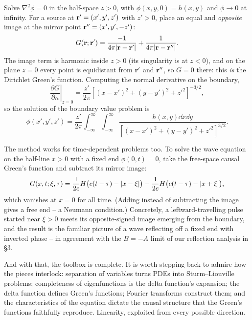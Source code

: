 \documentclass[a4paper]{scrartcl}
\begin{document}
\begin{example}
    Solve $\nabla^2 \phi = 0$ in the half-space $z > 0$, with $\phi(x, y, 0) = h(x, y)$ and $\phi \to 0$ at infinity.
    For a source at $\mathbf{r}' = (x', y', z')$ with $z' > 0$, place an equal and \emph{opposite} image at the mirror point $\mathbf{r}'' = (x', y', -z')$:
    $$
    G(\mathbf{r}; \mathbf{r}') = \frac{-1}{4 \pi \lvert\mathbf{r} - \mathbf{r}'\rvert} + \frac{1}{4 \pi \lvert\mathbf{r} - \mathbf{r}''\rvert}.
    $$
    The image term is harmonic inside $z > 0$ (its singularity is at $z < 0$), and on the plane $z = 0$ every point is equidistant from $\mathbf{r}'$ and $\mathbf{r}''$, so $G = 0$ there: this \emph{is} the Dirichlet Green's function. Computing the normal derivative on the boundary,
    $$
    \left.\frac{\partial G}{\partial n}\right|_{z = 0} = \frac{z'}{2 \pi}\left[(x - x')^2 + (y - y')^2 + z'^2\right]^{-3/2},
    $$
    so the solution of the boundary value problem is
    $$
    \phi(x', y', z') = \frac{z'}{2\pi} \int_{-\infty}^{\infty}\int_{-\infty}^{\infty} \frac{h(x, y) \dd x \dd y}{\left[(x - x')^2 + (y - y')^2 + z'^2\right]^{3/2}}.
    $$
\end{example}

\begin{example}
    The method works for time-dependent problems too. To solve the wave equation on the half-line $x > 0$ with a fixed end $\phi(0, t) = 0$, take the free-space causal Green's function and subtract its mirror image:
    $$
    G(x, t; \xi, \tau) = \frac{1}{2c}H\big(c(t - \tau) - \lvert x - \xi\rvert\big) - \frac{1}{2c}H\big(c(t - \tau) - \lvert x + \xi\rvert\big),
    $$
    which vanishes at $x = 0$ for all time. (Adding instead of subtracting the image gives a free end -- a Neumann condition.) Concretely, a leftward-travelling pulse started near $\xi > 0$ meets its opposite-signed image emerging from the boundary, and the result is the familiar picture of a wave reflecting off a fixed end with inverted phase -- in agreement with the $B = -A$ limit of our reflection analysis in \S 3.
\end{example}

And with that, the toolbox is complete. It is worth stepping back to admire how the pieces interlock: separation of variables turns PDEs into Sturm--Liouville problems; completeness of eigenfunctions is the delta function's expansion; the delta function defines Green's functions; Fourier transforms construct them; and the characteristics of the equation dictate the causal structure that the Green's functions faithfully reproduce. Linearity, exploited from every possible direction.
\end{document}
